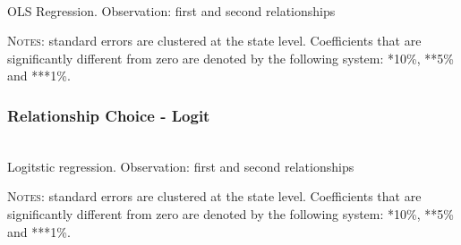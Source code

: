 \documentclass[12pt]{article}
\numberwithin{table}{section}
\begin{document}

	\begin{table}[htbp]\centering
	\caption{\\OLS Regression. Observation: first and second relationships}
	\label{table:wmarlinc}
	\begin{threeparttable}[t]\centering
	
	\begin{tablenotes}[flushleft]
	\footnotesize{\item \textsc{Notes}: standard errors are clustered at the state level.
		Coefficients that are significantly different from zero are denoted by the following system: *10\%, **5\%  and ***1\%.}
	\end{tablenotes}
	\end{threeparttable}
	\end{table}


\FloatBarrier
\subsubsection*{Relationship Choice - Logit}

	\begin{table}[htbp]\centering
	\caption{\\Logitstic regression. Observation: first and second relationships}
	\label{table:wmar_logit}
	\begin{threeparttable}[t]\centering
	
	\begin{tablenotes}[flushleft]
	\footnotesize{\item \textsc{Notes}: standard errors are clustered at the state level.
		Coefficients that are significantly different from zero are denoted by the following system: *10\%, **5\%  and ***1\%.}
	\end{tablenotes}
	\end{threeparttable}
	\end{table}
\end{document}
